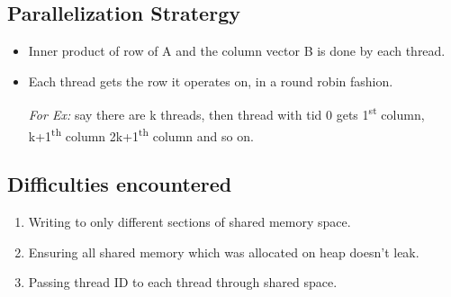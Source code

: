 \documentclass{article}
\begin{document}
\subsection{Parallelization Stratergy}

\begin{itemize}
    \item Inner product of row of A and the column vector B 
    is done by each thread.

    \item Each thread gets the row it operates on, in a 
    round robin fashion. 
    
    \textit{For Ex:} say there are k threads, then thread with 
    tid 0 gets 1\textsuperscript{st} column, k+1\textsuperscript{th} 
    column 2k+1\textsuperscript{th} column and so on.


\end{itemize}

\subsection{Difficulties encountered}

\begin{enumerate}
    \item Writing to only different sections of 
    shared memory space.
    \item Ensuring all shared memory which was 
    allocated on heap doesn't leak.
    \item Passing thread ID to each thread 
    through shared space. 
\end{enumerate}

\printbibliography
\end{document}
